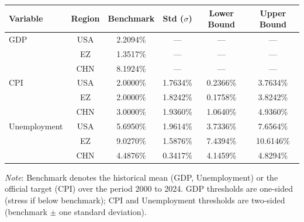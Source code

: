\begin{tabular}{lccccc}
  \toprule
  \textbf{Variable} & \textbf{Region} & \textbf{Benchmark} & \textbf{Std ($\sigma$)} & \textbf{Lower Bound} & \textbf{Upper Bound} \\ 
  \midrule
  GDP & USA & 2.2094\% & --- & --- & --- \\ 
   & EZ & 1.3517\% & --- & --- & --- \\ 
   & CHN & 8.1924\% & --- & --- & --- \\ 
  CPI & USA & 2.0000\% & 1.7634\% & 0.2366\% & 3.7634\% \\ 
   & EZ & 2.0000\% & 1.8242\% & 0.1758\% & 3.8242\% \\ 
   & CHN & 3.0000\% & 1.9360\% & 1.0640\% & 4.9360\% \\ 
  Unemployment & USA & 5.6950\% & 1.9614\% & 3.7336\% & 7.6564\% \\ 
   & EZ & 9.0270\% & 1.5876\% & 7.4394\% & 10.6146\% \\ 
   & CHN & 4.4876\% & 0.3417\% & 4.1459\% & 4.8294\% \\ 
  \bottomrule
\end{tabular}
\par\vspace{4pt}
\begin{minipage}{\linewidth}
  \footnotesize \textit{Note}: Benchmark denotes the historical mean (GDP, Unemployment) or the official target (CPI) over the period 2000 to 2024. GDP thresholds are one-sided (stress if below benchmark); CPI and Unemployment thresholds are two-sided (benchmark $\pm$ one standard deviation).
\end{minipage}
